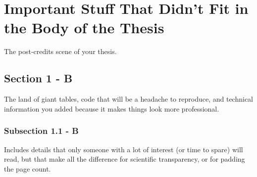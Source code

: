 %

\chapter{Important Stuff That Didn't Fit in the Body of the Thesis}\label{apen:apendiceB}

The post-credits scene of your thesis.

\section{Section 1 - B}

The land of giant tables, code that will be a headache to reproduce, and technical information you added because it makes things look more professional.

\subsection{Subsection 1.1 - B}

Includes details that only someone with a lot of interest (or time to spare) will read, but that make all the difference for scientific transparency, or for padding the page count.
